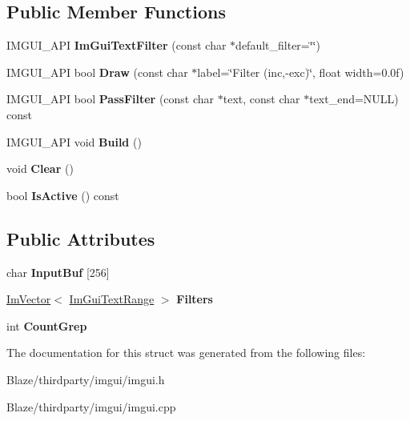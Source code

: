 \subsection*{Public Member Functions}
\begin{DoxyCompactItemize}
\item 
\mbox{\label{structImGuiTextFilter_a0a61ee76f0b4f3c354791734b06e3140}} 
I\+M\+G\+U\+I\+\_\+\+A\+PI {\bfseries Im\+Gui\+Text\+Filter} (const char $\ast$default\+\_\+filter=\char`\"{}\char`\"{})
\item 
\mbox{\label{structImGuiTextFilter_ab93ad5985019ff9d3781606551fc26cc}} 
I\+M\+G\+U\+I\+\_\+\+A\+PI bool {\bfseries Draw} (const char $\ast$label=\char`\"{}Filter (inc,-\/exc)\char`\"{}, float width=0.\+0f)
\item 
\mbox{\label{structImGuiTextFilter_a88d73ff8b81fbbd0a129b1bf3498d8aa}} 
I\+M\+G\+U\+I\+\_\+\+A\+PI bool {\bfseries Pass\+Filter} (const char $\ast$text, const char $\ast$text\+\_\+end=N\+U\+LL) const
\item 
\mbox{\label{structImGuiTextFilter_aef362baafaa9dfa62d11bc6101c0f4c1}} 
I\+M\+G\+U\+I\+\_\+\+A\+PI void {\bfseries Build} ()
\item 
\mbox{\label{structImGuiTextFilter_a9043c1f0c33d29e6fc9b75ae81f9705a}} 
void {\bfseries Clear} ()
\item 
\mbox{\label{structImGuiTextFilter_a493158f2ab8f45fcf303c3f953be9b88}} 
bool {\bfseries Is\+Active} () const
\end{DoxyCompactItemize}
\subsection*{Public Attributes}
\begin{DoxyCompactItemize}
\item 
\mbox{\label{structImGuiTextFilter_ad070acb1038199dd4e8f5d010c5cb5ba}} 
char {\bfseries Input\+Buf} \mbox{[}256\mbox{]}
\item 
\mbox{\label{structImGuiTextFilter_a39ed87cfdf3cb0cdb8389b017bb00067}} 
\hyperlink{structImVector}{Im\+Vector}$<$ \hyperlink{structImGuiTextFilter_1_1ImGuiTextRange}{Im\+Gui\+Text\+Range} $>$ {\bfseries Filters}
\item 
\mbox{\label{structImGuiTextFilter_ac31839c319fe4211c21fc143b7249f86}} 
int {\bfseries Count\+Grep}
\end{DoxyCompactItemize}


The documentation for this struct was generated from the following files\+:\begin{DoxyCompactItemize}
\item 
Blaze/thirdparty/imgui/imgui.\+h\item 
Blaze/thirdparty/imgui/imgui.\+cpp\end{DoxyCompactItemize}
